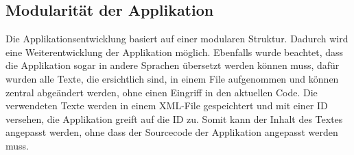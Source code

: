 \subsection{Modularität der Applikation}

Die Applikationsentwicklung basiert auf einer modularen Struktur.  Dadurch wird eine Weiterentwicklung der Applikation möglich. Ebenfalls wurde beachtet, dass die Applikation sogar in andere Sprachen übersetzt werden können muss, dafür wurden alle Texte, die ersichtlich sind, in einem File aufgenommen und können zentral abgeändert werden, ohne einen Eingriff in den aktuellen Code. Die verwendeten Texte werden in einem XML-File gespeichtert und mit einer ID versehen, die Applikation greift auf die ID zu. Somit kann der Inhalt des Textes angepasst werden, ohne dass der Sourcecode der Applikation angepasst werden muss.






